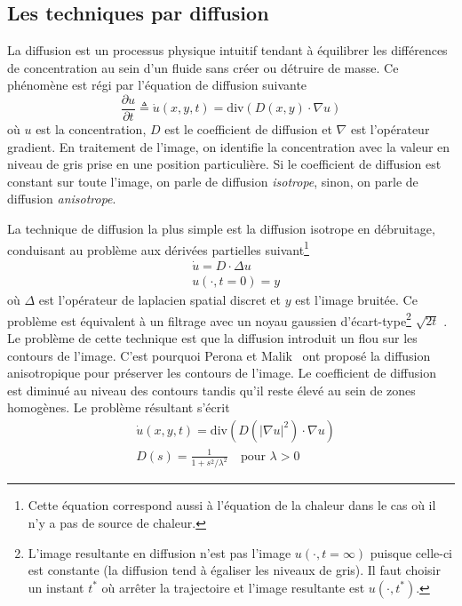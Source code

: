 \subsection{Les techniques par diffusion}

La diffusion est un processus physique intuitif tendant à équilibrer les différences de concentration au sein d'un fluide sans créer ou détruire de masse. Ce phénomène est régi par l'équation de diffusion suivante
\begin{equation}
    \frac{\partial u}{\partial t} \triangleq \dot{u}(x, y, t) = \mathrm{div} (D(x, y)\cdot \nabla u)
\end{equation}
où $u$ est la concentration, $D$ est le coefficient de diffusion et $\nabla$ est l'opérateur gradient. En traitement de l'image, on identifie la concentration avec la valeur en niveau de gris prise en une position particulière. Si le coefficient de diffusion est constant sur toute l'image, on parle de diffusion \emph{isotrope}, sinon, on parle de diffusion \emph{anisotrope}.

La technique de diffusion la plus simple est la diffusion isotrope en débruitage, conduisant au problème aux dérivées partielles suivant\footnote{Cette équation correspond aussi à l'équation de la chaleur dans le cas où il n'y a pas de source de chaleur.}
\begin{align}
&\dot{u} = D \cdot \Delta u\\
&u(\cdot, t=0) = y
\end{align}
où $\Delta$ est l'opérateur de laplacien spatial discret et $y$ est l'image bruitée. Ce problème est équivalent à un filtrage avec un noyau gaussien d'écart-type\footnote{L'image resultante en diffusion n'est pas l'image $u(\cdot, t=\infty)$ puisque celle-ci est constante (la diffusion tend à égaliser les niveaux de gris). Il faut choisir un instant $t^*$ où arrêter la trajectoire et l'image resultante est $u(\cdot, t^*)$.} $\sqrt{2t}$ \cite{weickert1998anisotropic}. Le problème de cette technique est que la diffusion introduit un flou sur les contours de l'image. C'est pourquoi Perona et Malik~\cite{perona1990scale} ont proposé la diffusion anisotropique pour préserver les contours de l'image. Le coefficient de diffusion est diminué au niveau des contours tandis qu'il reste élevé au sein de zones homogènes. Le problème résultant s'écrit
\begin{align}
    &\dot{u}(x, y, t) = \mathrm{div} (D(|\nabla u|^2)\cdot \nabla u)\\
    & D(s) = \frac{1}{1+s^2/\lambda^2} \quad \text{pour $\lambda > 0$}
\end{align}

